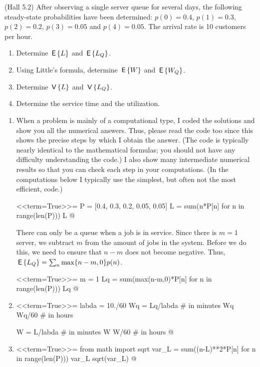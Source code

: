 \begin{question}(Hall 5.2) After observing a single server queue for
  several days, the following steady-state probabilities have been
  determined: $p(0)=0.4$, $p(1) = 0.3$, $p(2)=0.2$, $p(3)=0.05$ and
  $p(4)=0.05$. The arrival rate is 10 customers per hour. 
  \begin{enumerate}
  \item Determine $\,\mathsf{E}\left\{L\right\}$ and  $\,\mathsf{E}\left\{L_Q\right\}$. 
  \item Using Little's formula, determine $\,\mathsf{E}\left\{W\right\}$ and $\,\mathsf{E}\left\{W_Q\right\}$. 
\item Determine $\,\mathsf{V}\left\{L\right\}$ and $\,\mathsf{V}\left\{L_Q\right\}$.
  \item Determine the service time and the utilization.
  \end{enumerate}
  

    \begin{solution}
      \begin{enumerate}
      \item 
      When a problem is mainly of a computational type, I coded the
      solutions and show you all the numerical answers. Thus, please
      read the code too since this shows the precise steps by which I
      obtain the answer. (The code is typically nearly identical to
      the mathematical formulas; you should not have any difficulty
      understanding the code.) I also show many intermediate numerical
      results so that you can check each step in your computations. (In
      the computations below I typically use the simplest, but often
      not the most efficient, code.)

<<term=True>>=
P = [0.4, 0.3, 0.2, 0.05, 0.05]
L = sum(n*P[n] for n in range(len(P)))
L
@ 

There can only be a queue when a job is in service. Since there is
$m=1$ server, we subtract $m$ from the amount of jobs in the system.
Before we do this, we need to ensure that $n-m$ does not become
negative. Thus, $\,\mathsf{E}\left\{L_Q\right\} = \sum_n \max\{n-m, 0\} p(n)$.

<<term=True>>=
m = 1
Lq = sum(max(n-m,0)*P[n] for n in range(len(P)))
Lq
@

\item 

<<term=True>>=
labda = 10./60
Wq = Lq/labda # in minutes
Wq
Wq/60 # in hours

W = L/labda # in minutes
W
W/60 # in hours
@ 

\item 

<<term=True>>=
from math import sqrt
var_L = sum((n-L)**2*P[n] for n in range(len(P)))
var_L
sqrt(var_L)
@



\end{enumerate}
\end{solution}
\end{question}
